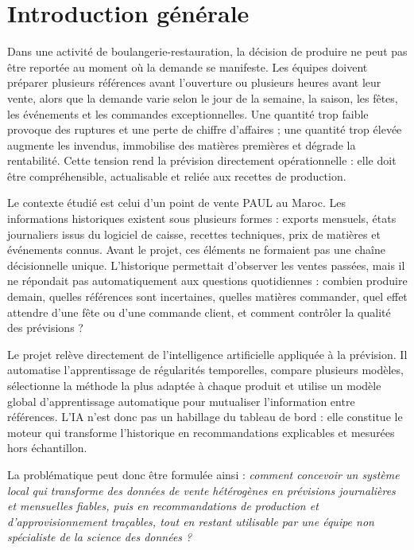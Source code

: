\chapter*{Introduction générale}
{}

Dans une activité de boulangerie-restauration, la décision de produire ne peut
pas être reportée au moment où la demande se manifeste. Les équipes doivent
préparer plusieurs références avant l'ouverture ou plusieurs heures avant leur
vente, alors que la demande varie selon le jour de la semaine, la saison, les
fêtes, les événements et les commandes exceptionnelles. Une quantité trop faible
provoque des ruptures et une perte de chiffre d'affaires ; une quantité trop
élevée augmente les invendus, immobilise des matières premières et dégrade la
rentabilité. Cette tension rend la prévision directement opérationnelle : elle
doit être compréhensible, actualisable et reliée aux recettes de production.

Le contexte étudié est celui d'un point de vente PAUL au Maroc. Les informations
historiques existent sous plusieurs formes : exports mensuels, états journaliers
issus du logiciel de caisse, recettes techniques, prix de matières et événements
connus. Avant le projet, ces éléments ne formaient pas une chaîne décisionnelle
unique. L'historique permettait d'observer les ventes passées, mais il ne répondait
pas automatiquement aux questions quotidiennes : combien produire demain,
quelles références sont incertaines, quelles matières commander, quel effet
attendre d'une fête ou d'une commande client, et comment contrôler la qualité
des prévisions ?

Le projet relève directement de l'intelligence artificielle appliquée à la
prévision. Il automatise l'apprentissage de régularités temporelles, compare
plusieurs modèles, sélectionne la méthode la plus adaptée à chaque produit et
utilise un modèle global d'apprentissage automatique pour mutualiser
l'information entre références. L'IA n'est donc pas un habillage du tableau de
bord : elle constitue le moteur qui transforme l'historique en recommandations
explicables et mesurées hors échantillon.

La problématique peut donc être formulée ainsi : \emph{comment concevoir un
système local qui transforme des données de vente hétérogènes en prévisions
journalières et mensuelles fiables, puis en recommandations de production et
d'approvisionnement traçables, tout en restant utilisable par une équipe non
spécialiste de la science des données ?}

